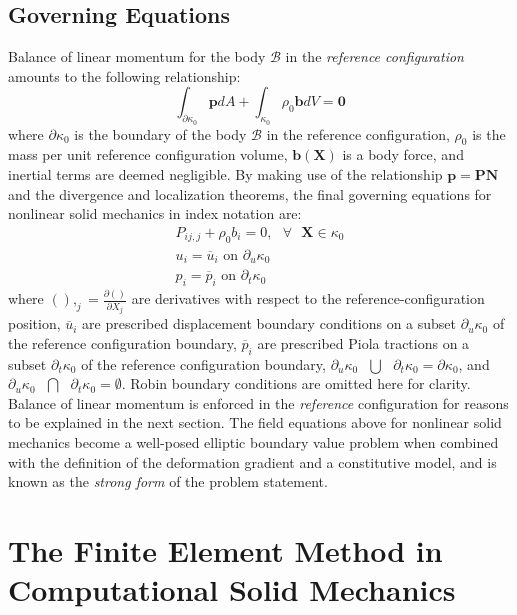 \subsection{Governing Equations}
Balance of linear momentum for the body $\mathcal{B}$ in the \textit{reference configuration} amounts to the following relationship:
\begin{equation}
\int_{\partial \kappa_0}\bm{p}dA + \int_{\kappa_0}\rho_0\bm{b}dV = \bm{0}
\end{equation}
where $\partial \kappa_0$ is the boundary of the body $\mathcal{B}$ in the reference configuration, $\rho_0$ is the mass per unit reference configuration volume, $\bm{b}(\bm{X})$ is a body force, and inertial terms are deemed negligible. By making use of the relationship $\bm{p} = \bm{P}\bm{N}$ and the divergence and localization theorems, the final governing equations for nonlinear solid mechanics in index notation are:
\begin{gather}
P_{ij,j} + \rho_0b_i = 0, \text{\ \ } \forall \text{\ \ } \bm{X} \in \kappa_0 \label{eqn:equilibrium} \\
{u_i} = \overline{{u}}_i \text{\ \ on\ \ } \partial_u\kappa_0 \\
{p_i} = \overline{{p}}_i\text{\ \ on\ \ } \partial_t\kappa_0
\end{gather}
where $(),_j = \frac{\partial()}{\partial {{X_j}}}$ are derivatives with respect to the reference-configuration position, $\overline{{u}}_i$ are prescribed displacement boundary conditions on a subset $\partial_u\kappa_0$ of the reference configuration boundary, ${\overline{p}_i}$ are prescribed Piola tractions on a subset $\partial_t\kappa_0$ of the reference configuration boundary, $\partial_u\kappa_0 \text{\ }\bigcup\text{\ } \partial_t\kappa_0 = \partial\kappa_0$, and $\partial_u\kappa_0 \text{\ }\bigcap\text{\ } \partial_t\kappa_0 = \emptyset$. Robin boundary conditions are omitted here for clarity. Balance of linear momentum is enforced in the \textit{reference} configuration for reasons to be explained in the next section. The field equations above for nonlinear solid mechanics become a well-posed elliptic boundary value problem when combined with the definition of the deformation gradient and a constitutive model, and is known as the \textit{strong form} of the problem statement.

\section{The Finite Element Method in Computational Solid Mechanics}
\label{The Finite Element Method in Computational Solid Mechanics}

